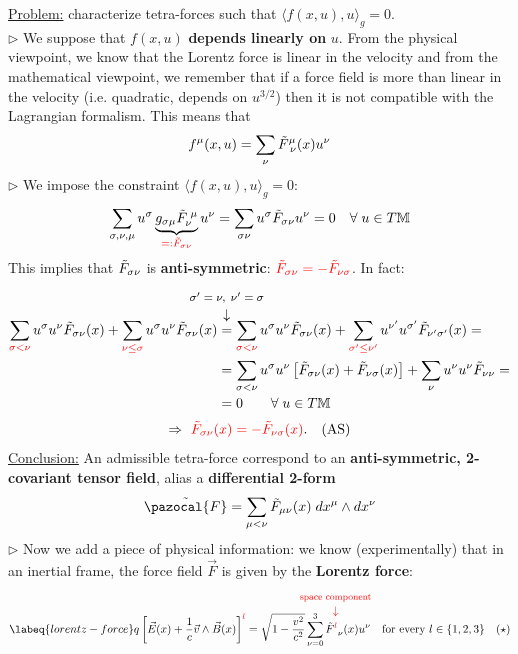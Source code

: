 \documentclass[../main.tex]{subfiles}
\begin{document}
\underline{Problem:} characterize tetra-forces such that $\langle f(x,u),u \rangle_g=0$.\\
$\triangleright$ We suppose that $f(x,u)$ \textbf{depends linearly on} $u$. From the physical viewpoint, we know that the Lorentz force is linear in the velocity and from the mathematical viewpoint, we remember that if a force field is more than linear in the velocity (i.e. quadratic, depends on $u^{3/2}$) then it is not compatible with the Lagrangian formalism. This means that
\[
f^{\mu}(x,u)=\sum_{\nu}\Tilde{F}_{\; \nu}^{\mu}(x)u^{\nu}
\]
$\triangleright$ We impose the constraint $\langle f(x,u),u \rangle_g=0$:
\[
\sum_{\sigma,\nu,\mu}u^{\sigma}\underbrace{g_{\sigma\mu}\Tilde{F}_{\nu}^{\;\mu}}_{\color{red}=:\Tilde{F}_{\sigma\nu}}u^{\nu}=\sum_{\sigma\nu}u^{\sigma}\Tilde{F}_{\sigma\nu}u^{\nu}=0 \quad \forall\; u\in T\mathbb{M}
\]
This implies that $\Tilde{F}_{\sigma\nu}$ is \textbf{anti-symmetric}: ${\color{red}\Tilde{F}_{\sigma\nu}=-\Tilde{F}_{\nu\sigma}}$. In fact:
\[
\begin{split}
\sum_{\color{red}\sigma<\nu}u^{\sigma}u^{\nu}\Tilde{F}_{\sigma\nu}(x) + \sum_{\color{red}\nu\leq\sigma}u^{\sigma}u^{\nu}\Tilde{F}_{\sigma\nu}(x)
&\overset{\mathclap{\tikz \node {$\downarrow$} node [above=1.25ex] {\footnotesize $\sigma'=\nu, \; \nu'=\sigma$};}}{=}\sum_{\color{red}\sigma<\nu}u^{\sigma}u^{\nu}\Tilde{F}_{\sigma\nu}(x) + \sum_{\color{red}\sigma'\leq\nu'}u^{\nu'}u^{\sigma'}\Tilde{F}_{\nu'\sigma'}(x)=\\
&=\sum_{\sigma<\nu}u^{\sigma}u^{\nu}\left[\Tilde{F}_{\sigma\nu}(x)+\Tilde{F}_{\nu\sigma}(x)\right]+\sum_\nu u^\nu u^\nu \Tilde{F}_{\nu\nu}=\\
&=0\qquad \forall\; u\in T\mathbb{M}
\end{split}
\]
\[
\Rightarrow\ {\color{red}\Tilde{F}_{\sigma\nu}(x)=-\Tilde{F}_{\nu\sigma}(x)}. \quad \textrm{(AS)}
\]
\underline{Conclusion:} An admissible tetra-force correspond to an \textbf{anti-symmetric, 2-covariant tensor field}, alias a \textbf{differential 2-form}
\[
\Tilde{\pazocal{F}}=\sum_{\mu<\nu}\Tilde{F}_{\mu\nu}(x)\;dx^{\mu}\wedge dx^{\nu}
\]
$\triangleright$ Now we add a piece of physical information: we know (experimentally) that in an inertial frame, the force field $\vec{F}$ is given by the \textbf{Lorentz force}:
\begin{equation}\labeq{lorentz-force}
q\left[\vec{E}(x)+\frac{1}{c}\vec{v}\wedge\vec{B}(x)\right]^{\color{red}l}=\sqrt{1-\frac{v^2}{c^2}}\sum_{\nu=0}^3 \Tilde{F}_{\;\;\nu}^{{\color{red}\overset{\mathclap{\tikz \node {$\downarrow$} node [above=1.25ex] {\footnotesize space component};}}l}}(x)u^{\nu} \quad\text{for every } l\in\{1,2,3\} \quad (\star)
\end{equation}
\end{document}
